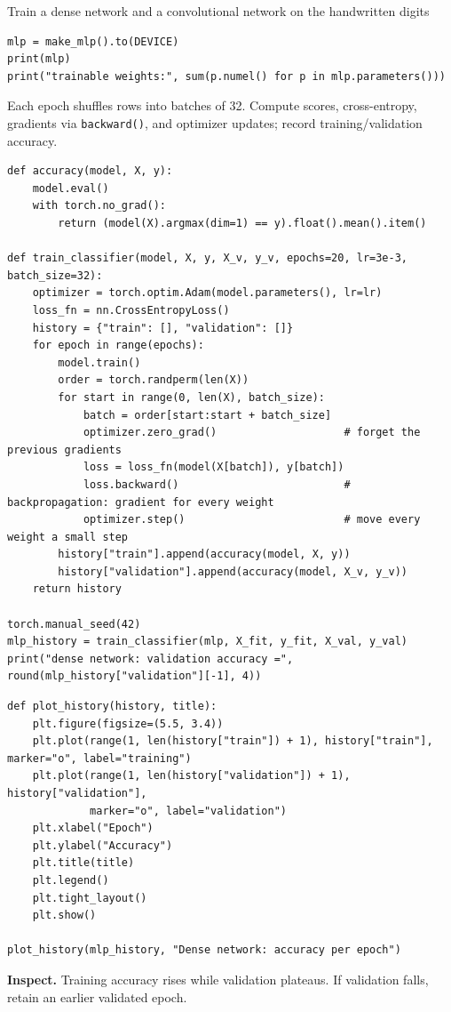 \begin{labproject}{Train a dense network and a convolutional network on the handwritten digits}
\begin{lstlisting}[style=utppython]
mlp = make_mlp().to(DEVICE)
print(mlp)
print("trainable weights:", sum(p.numel() for p in mlp.parameters()))
\end{lstlisting}

Each epoch shuffles rows into batches of 32. Compute scores, cross-entropy, gradients via \texttt{backward()}, and optimizer updates; record training/validation accuracy.

\begin{lstlisting}[style=utppython]
def accuracy(model, X, y):
    model.eval()
    with torch.no_grad():
        return (model(X).argmax(dim=1) == y).float().mean().item()

def train_classifier(model, X, y, X_v, y_v, epochs=20, lr=3e-3, batch_size=32):
    optimizer = torch.optim.Adam(model.parameters(), lr=lr)
    loss_fn = nn.CrossEntropyLoss()
    history = {"train": [], "validation": []}
    for epoch in range(epochs):
        model.train()
        order = torch.randperm(len(X))
        for start in range(0, len(X), batch_size):
            batch = order[start:start + batch_size]
            optimizer.zero_grad()                    # forget the previous gradients
            loss = loss_fn(model(X[batch]), y[batch])
            loss.backward()                          # backpropagation: gradient for every weight
            optimizer.step()                         # move every weight a small step
        history["train"].append(accuracy(model, X, y))
        history["validation"].append(accuracy(model, X_v, y_v))
    return history

torch.manual_seed(42)
mlp_history = train_classifier(mlp, X_fit, y_fit, X_val, y_val)
print("dense network: validation accuracy =", round(mlp_history["validation"][-1], 4))
\end{lstlisting}

\begin{lstlisting}[style=utppython]
def plot_history(history, title):
    plt.figure(figsize=(5.5, 3.4))
    plt.plot(range(1, len(history["train"]) + 1), history["train"], marker="o", label="training")
    plt.plot(range(1, len(history["validation"]) + 1), history["validation"],
             marker="o", label="validation")
    plt.xlabel("Epoch")
    plt.ylabel("Accuracy")
    plt.title(title)
    plt.legend()
    plt.tight_layout()
    plt.show()

plot_history(mlp_history, "Dense network: accuracy per epoch")
\end{lstlisting}

\textbf{Inspect.} Training accuracy rises while validation plateaus. If validation falls, retain an earlier validated epoch.


\end{labproject}
